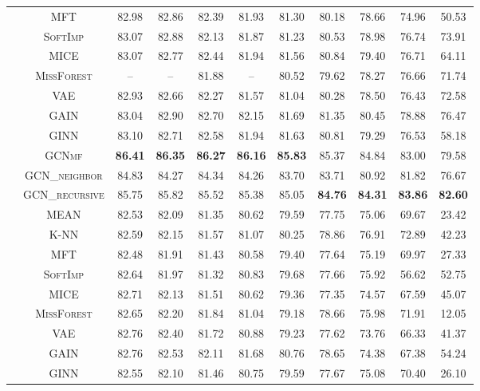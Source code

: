 \begin{table}[!pt]
{\begin{tabular}{c|c|ccccccccc}
& \textsc{MFT} & 82.98 & 82.86 & 82.39 & 81.93 & 81.30 & 80.18 & 78.66 & 74.96 & 50.53\\
& \textsc{SoftImp} & 83.07 & 82.88 & 82.13 & 81.87 & 81.23 & 80.53 & 78.98 & 76.74 & 73.91\\
& \textsc{MICE} & 83.07 & 82.77 & 82.44 & 81.94 & 81.56 & 80.84 & 79.40 & 76.71 & 64.11\\
& \textsc{MissForest} & -- & -- & 81.88 & -- & 80.52 & 79.62 & 78.27 & 76.66 & 71.74\\
& \textsc{VAE} & 82.93 & 82.66 & 82.27 & 81.57 & 81.04 & 80.28 & 78.50 & 76.43 & 72.58\\
& \textsc{GAIN} & 83.04 & 82.90 & {82.70} & {82.15} & {81.69} & 81.35 & {80.45} & {78.88} & {76.47}\\
& \textsc{GINN} & {83.10} & 82.71 & 82.58 & 81.94 & 81.63 & 80.81 & 79.29 & 76.53 & 58.18\\
& \textsc{GCNmf} & \textbf{86.41} & \textbf{86.35} & \textbf{86.27} & \textbf{86.16} & \textbf{85.83} & 85.37 & 84.84 & 83.00 & 79.58\\ 
& \textsc{GCN\_neighbor}  & 84.83 & 84.27 & 84.34 & 84.26 & 83.70 & 83.71 & 80.92 & 81.82 & 76.67 \\
& \textsc{GCN\_recursive}  & 85.75 & 85.82 & 85.52 & 85.38 & 85.05 & \textbf{84.76} & \textbf{84.31} & \textbf{83.86} & \textbf{82.60} \\ 
\midrule
{} & \textsc{MEAN} & 82.53 & 82.09 & 81.35 & 80.62 & 79.59 & 77.75 & 75.06 & 69.67 & 23.42\\
& \textsc{K-NN} & 82.59 & 82.15 & 81.57 & 81.07 & 80.25 & {78.86} & {76.91} & {72.89} & 42.23\\
& \textsc{MFT} & 82.48 & 81.91 & 81.43 & 80.58 & 79.40 & 77.64 & 75.19 & 69.97 & 27.33\\
& \textsc{SoftImp} & 82.64 & 81.97 & 81.32 & 80.83 & 79.68 & 77.66 & 75.92 & 56.62 & 52.75\\
& \textsc{MICE} & 82.71 & 82.13 & 81.51 & 80.62 & 79.36 & 77.35 & 74.57 & 67.59 & 45.07\\
& \textsc{MissForest} & 82.65 & 82.20 & 81.84 & 81.04 & 79.18 & 78.66 & 75.98 & 71.91 & 12.05\\
& \textsc{VAE} & {82.76} & 82.40 & 81.72 & 80.88 & 79.23 & 77.62 & 73.76 & 66.33 & 41.37\\
& \textsc{GAIN} & {82.76} & {82.53} & {82.11} & {81.68} & {80.76} & 78.65 & 74.38 & 67.38 & {54.24}\\
& \textsc{GINN} & 82.55 & 82.10 & 81.46 & 80.75 & 79.59 & 77.67 & 75.08 & 70.40 & 26.10\\

\end{tabular}}
\end{table}
